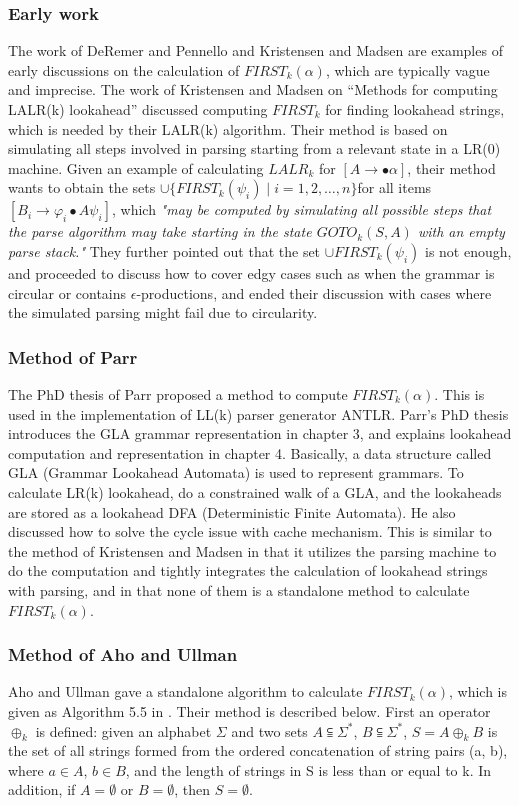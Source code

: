 \documentclass{sig-alternate-05-2015}
\begin{document}
\subsubsection{Early work}
The work of DeRemer and Pennello \cite{DeRemer82lalr} and Kristensen and
Madsen \cite{kristensen81lalr} are examples of early discussions on the calculation
of $FIRST_k(\alpha)$, which are typically vague and imprecise.
The work of Kristensen and Madsen \cite{kristensen81lalr} on “Methods
for computing LALR(k) lookahead” discussed computing
$FIRST_k$ for finding lookahead strings, which is needed by
their LALR(k) algorithm. Their method is based on simulating
all steps involved in parsing starting from a relevant
state in a LR(0) machine. Given an example of calculating
$LALR_k$ for $[A\rightarrow \bullet \alpha]$, their method wants to obtain the
sets $\cup \{FIRST_k(\psi_i) \mid i = 1,2, …, n\} $for all items 
$[B_i\rightarrow \varphi_i \bullet A \psi_i]$, which 
\textit{"may be computed by simulating all possible
steps that the parse algorithm may take starting in the state
$GOTO_k(S, A)$ with an empty parse stack."}
They further
pointed out that the set $\cup {FIRST_k(\psi_i)}$ is not enough, and
proceeded to discuss how to cover edgy cases such as when
the grammar is circular or contains $\epsilon$-productions, and
ended their discussion with cases where the simulated parsing
might fail due to circularity.

\subsubsection{Method of Parr}
The PhD thesis of Parr \cite{parr93ll} proposed a method to compute
$FIRST_k(\alpha)$. This is used in the implementation of LL(k)
parser generator ANTLR. Parr’s PhD thesis introduces the
GLA grammar representation in chapter 3, and explains
lookahead computation and representation in chapter 4.
Basically, a data structure called GLA (Grammar
Lookahead Automata) is used to represent grammars. To
calculate LR(k) lookahead, do a constrained walk of a
GLA, and the lookaheads are stored as a lookahead DFA
(Deterministic Finite Automata). He also discussed how to
solve the cycle issue with cache mechanism.
This is similar to the method of Kristensen and Madsen
in that it utilizes the parsing machine to do the computation
and tightly integrates the calculation of lookahead strings
with parsing, and in that none of them is a standalone
method to calculate $FIRST_k(\alpha)$.

\subsubsection{Method of Aho and Ullman}
Aho and Ullman gave a standalone algorithm to calculate
$FIRST_k(\alpha)$, which is given as Algorithm 5.5 in \cite{aho72parsing}. 
Their method is described below.
First an operator $\oplus_k$ is defined: given an alphabet $\Sigma$ and
two sets $A \subseteqq \Sigma^*$, $B \subseteqq \Sigma^*$, $S = A \oplus_k B$ 
is the set of all
strings formed from the ordered concatenation of string
pairs (a, b), where $a \in A$, $b \in B$, and the length of strings in
S is less than or equal to k. In addition, if $ A = \emptyset $ or $ B = \emptyset $,
then $ S =  \emptyset$.
\end{document}
